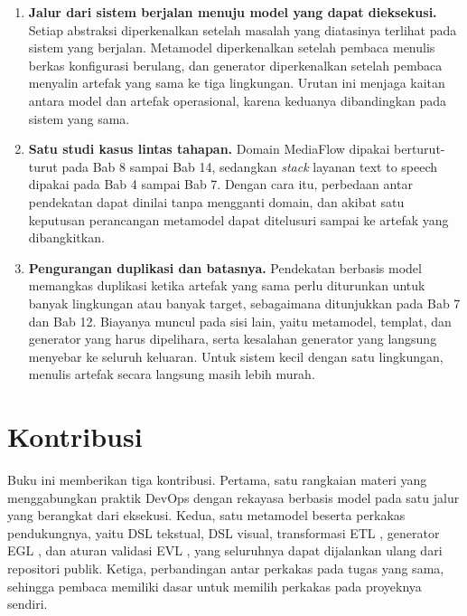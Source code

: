 \begin{enumerate}
  \item \textbf{Jalur dari sistem berjalan menuju model yang dapat dieksekusi.}
        Setiap abstraksi diperkenalkan setelah masalah yang diatasinya terlihat
        pada sistem yang berjalan. Metamodel diperkenalkan setelah pembaca
        menulis berkas konfigurasi berulang, dan generator diperkenalkan setelah
        pembaca menyalin artefak yang sama ke tiga lingkungan. Urutan ini
        menjaga kaitan antara model dan artefak operasional, karena keduanya
        dibandingkan pada sistem yang sama.
  \item \textbf{Satu studi kasus lintas tahapan.} Domain MediaFlow dipakai
        berturut-turut pada Bab 8 sampai Bab 14, sedangkan \textit{stack} layanan
        text to speech dipakai pada Bab 4 sampai Bab 7. Dengan cara itu,
        perbedaan antar pendekatan dapat dinilai tanpa mengganti domain, dan
        akibat satu keputusan perancangan metamodel dapat ditelusuri sampai ke
        artefak yang dibangkitkan.
  \item \textbf{Pengurangan duplikasi dan batasnya.} Pendekatan berbasis model
        memangkas duplikasi ketika artefak yang sama perlu diturunkan untuk
        banyak lingkungan atau banyak target, sebagaimana ditunjukkan pada Bab 7
        dan Bab 12. Biayanya muncul pada sisi lain, yaitu metamodel, templat, dan
        generator yang harus dipelihara, serta kesalahan generator yang langsung
        menyebar ke seluruh keluaran. Untuk sistem kecil dengan satu lingkungan,
        menulis artefak secara langsung masih lebih murah.
\end{enumerate}

\section*{Kontribusi}

Buku ini memberikan tiga kontribusi. Pertama, satu rangkaian materi yang
menggabungkan praktik DevOps \cite{bass2015devops, humble2010cd, morris2021iac}
dengan rekayasa berbasis model \cite{schmidt2006mde, brambilla2017mdse} pada satu
jalur yang berangkat dari eksekusi. Kedua, satu metamodel beserta perkakas
pendukungnya, yaitu DSL tekstual, DSL visual, transformasi ETL
\cite{kolovos2008etl}, generator EGL \cite{rose2008egl}, dan aturan validasi EVL
\cite{kolovos2009evl}, yang seluruhnya dapat dijalankan ulang dari repositori
publik. Ketiga, perbandingan antar perkakas pada tugas yang sama, sehingga
pembaca memiliki dasar untuk memilih perkakas pada proyeknya sendiri.

